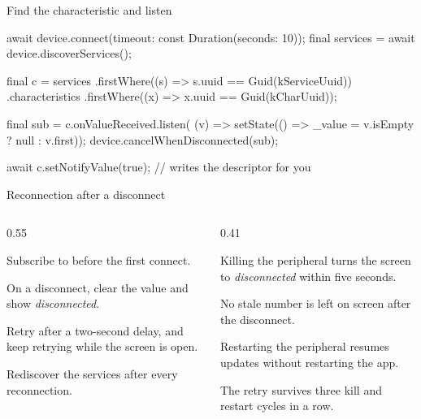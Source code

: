 \documentclass[10pt,aspectratio=169,t]{beamer}
\begin{document}
\begin{frame}[fragile,eyebrow=Reference]{Find the characteristic and listen}
\begin{dart}
await device.connect(timeout: const Duration(seconds: 10));
final services = await device.discoverServices();

final c = services
    .firstWhere((s) => s.uuid == Guid(kServiceUuid))
    .characteristics
    .firstWhere((x) => x.uuid == Guid(kCharUuid));

final sub = c.onValueReceived.listen(
    (v) => setState(() => _value = v.isEmpty ? null : v.first));
device.cancelWhenDisconnected(sub);

await c.setNotifyValue(true);   // writes the descriptor for you
\end{dart}
\end{frame}

\begin{frame}[eyebrow=Task III]{Reconnection after a disconnect}
  \begin{columns}[T]
    \begin{column}{0.55\textwidth}
      \begin{steps}
        \item Subscribe to  before the first connect.
        \item On a disconnect, clear the value and show \emph{disconnected}.
        \item Retry after a two-second delay, and keep retrying while the screen is open.
        \item Rediscover the services after every reconnection.
      \end{steps}
    \end{column}
    \begin{column}{0.41\textwidth}
      \begin{checklist}
        \item Killing the peripheral turns the screen to \emph{disconnected} within five seconds.
        \item No stale number is left on screen after the disconnect.
        \item Restarting the peripheral resumes updates without restarting the app.
        \item The retry survives three kill and restart cycles in a row.
      \end{checklist}
    \end{column}
  \end{columns}
\end{frame}
\end{document}
